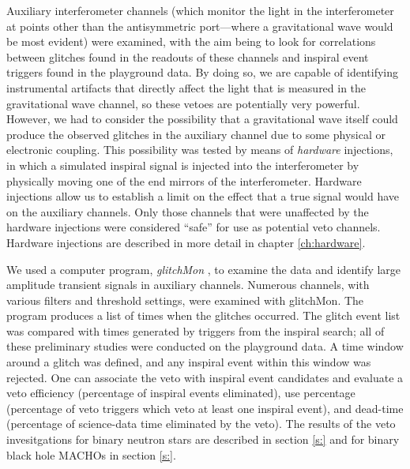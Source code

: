 Auxiliary interferometer channels (which monitor the light in the
interferometer at points other than the antisymmetric port---where a
gravitational wave would be most evident) were examined, with the aim being to
look for correlations between glitches found in the readouts of these channels
and inspiral event triggers found in the playground data.  By doing so, we are
capable of identifying instrumental artifacts that directly affect the light
that is measured in the gravitational wave channel, so these vetoes are
potentially very powerful.  However, we had to consider the possibility that a
gravitational wave itself could produce the observed glitches in the auxiliary
channel due to some physical or electronic coupling.  This possibility was
tested by means of {\em hardware} injections, in which a simulated inspiral
signal is injected into the interferometer by physically moving one of the end
mirrors of the interferometer. Hardware injections allow us to establish a
limit on the effect that a true signal would have on the auxiliary channels.
Only those channels that were unaffected by the hardware injections were
considered ``safe'' for use as potential veto channels. Hardware injections
are described in more detail in chapter \ref{ch:hardware}.

We used a computer program, {\it glitchMon} \cite{glitchMon}, to examine the
data and identify large amplitude transient signals in auxiliary channels.
Numerous channels, with various filters and threshold settings, were examined
with glitchMon. The program produces a list of times when the glitches
occurred. The glitch event list was compared with times generated by triggers
from the inspiral search; all of these preliminary studies were conducted on
the playground data. A time window around a glitch was defined, and any
inspiral event within this window was rejected. One can associate the veto
with inspiral event candidates and evaluate a veto efficiency (percentage of
inspiral events eliminated), use percentage (percentage of veto triggers which
veto at least one inspiral event), and dead-time (percentage of science-data
time eliminated by the veto). The results of the veto invesitgations for
binary neutron stars are described in section \ref{s:} and for binary black
hole MACHOs in section \ref{s:}.

